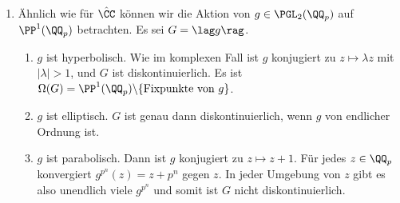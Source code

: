 \begin{enumerate}
\item Ähnlich wie für $\hat{\CC}$ können wir die Aktion von
$g\in\PGL_2(\QQ_p)$ auf $\PP^1(\QQ_p)$ betrachten.
Es sei $G=\lag g\rag$.
\begin{enumerate}
\item $g$ ist hyperbolisch. Wie im komplexen Fall ist $g$ konjugiert
zu $z\mapsto\lambda z$ mit $|\lambda|>1$, und $G$ ist diskontinuierlich.
Es ist $\Omega(G)=\PP^1(\QQ_p)\backslash\{\text{Fixpunkte von }g\}$.
\item $g$ ist elliptisch. $G$ ist genau dann diskontinuierlich, wenn
$g$ von endlicher Ordnung ist.
\item $g$ ist parabolisch. Dann ist $g$ konjugiert zu $z\mapsto z+1$.
Für jedes $z\in\QQ_p$ konvergiert $g^{p^n}(z)=z+p^n$ gegen $z$.
In jeder Umgebung von $z$ gibt es also unendlich viele $g^{p^n}$
und somit ist $G$ nicht diskontinuierlich.
\end{enumerate}
\end{enumerate}


